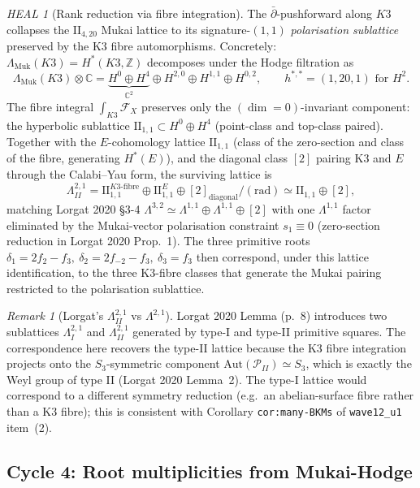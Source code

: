 \documentclass[11pt]{amsart}
\providecommand{\C}{\mathbb{C}}
\providecommand{\Z}{\mathbb{Z}}
\providecommand{\cF}{\mathcal{F}}
\providecommand{\Lat}{\Lambda}
\providecommand{\PII}{\mathcal{P}_{II}}
\providecommand{\dbar}{\bar{\partial}}
\theoremstyle{plain}
\theoremstyle{definition}
\theoremstyle{remark}
\newtheorem{remark}[theorem]{Remark}
\newtheorem*{heal}{HEAL}
\begin{document}
\begin{heal}[Rank reduction via fibre integration]
\label{heal:lattice}
The $\dbar$-pushforward along $K3$ collapses the $\mathrm{II}_{4,20}$
Mukai lattice to its signature-$(1,1)$ \emph{polarisation sublattice}
preserved by the K3 fibre automorphisms. Concretely: $\Lat_{\mathrm{Muk}}(K3)=
H^\ast(K3,\Z)$ decomposes under the Hodge filtration as
\[
\Lat_{\mathrm{Muk}}(K3)\otimes\C = \underbrace{H^0\oplus H^4}_{\C^2}
\oplus H^{2,0}\oplus H^{1,1}\oplus H^{0,2},
\qquad
h^{\ast,\ast}=(1,20,1) \text{ for } H^2.
\]
The fibre integral $\int_{K3}\cF_X$ preserves only the
$(\dim=0)$-invariant component: the hyperbolic sublattice
$\mathrm{II}_{1,1}\subset H^0\oplus H^4$ (point-class and top-class
paired). Together with the $E$-cohomology lattice $\mathrm{II}_{1,1}$
(class of the zero-section and class of the fibre, generating
$H^\ast(E)$), and the diagonal class $[2]$ pairing K3 and $E$ through
the Calabi--Yau form, the surviving lattice is
\[
\Lat^{2,1}_{II} = \mathrm{II}_{1,1}^{K3\text{-fibre}}\oplus
\mathrm{II}_{1,1}^{E}\oplus [2]_{\text{diagonal}}/\mathrm{(rad)}
\simeq \mathrm{II}_{1,1}\oplus [2],
\]
matching Lorgat 2020 \S3-4 $\Lat^{3,2}\simeq\Lat^{1,1}\oplus\Lat^{1,1}
\oplus[2]$ with one $\Lat^{1,1}$ factor eliminated by the Mukai-vector
polarisation constraint $s_1\equiv 0$ (zero-section reduction in
Lorgat 2020 Prop.~1). The three primitive roots
$\delta_1=2f_2-f_3,\ \delta_2=2f_{-2}-f_3,\ \delta_3=f_3$ then correspond,
under this lattice identification, to the three K3-fibre classes that
generate the Mukai pairing restricted to the polarisation sublattice.
\end{heal}

\begin{remark}[Lorgat's $\Lat^{2,1}_{II}$ vs $\Lat^{2,1}$]
Lorgat 2020 Lemma (p.~8) introduces two sublattices $\Lat^{2,1}_I$ and
$\Lat^{2,1}_{II}$ generated by type-I and type-II primitive squares.
The correspondence here recovers the type-II lattice because the K3
fibre integration projects onto the $S_3$-symmetric component
$\mathrm{Aut}(\PII)\simeq S_3$, which is exactly the Weyl group of
type II (Lorgat 2020 Lemma~2). The type-I lattice would correspond to
a different symmetry reduction (e.g.\ an abelian-surface fibre rather
than a K3 fibre); this is consistent with Corollary
\texttt{cor:many-BKMs} of \texttt{wave12\_u1} item~(2).
\end{remark}

\subsection{Cycle 4: Root multiplicities from Mukai-Hodge}
\end{document}
